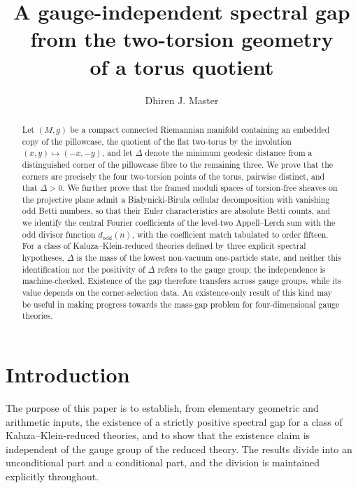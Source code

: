\documentclass[11pt,a4paper]{article}
\title{A gauge-independent spectral gap from the two-torsion geometry\\ of a torus quotient}
\author{Dhiren J. Master}
\date{}
\newcommand{\dodd}{d_{\mathrm{odd}}}
\theoremstyle{plain}
\theoremstyle{definition}
\theoremstyle{remark}
\begin{document}
\maketitle

\begin{abstract}
Let $(M,g)$ be a compact connected Riemannian manifold containing an
embedded copy of the pillowcase, the quotient of the flat two-torus by
the involution $(x,y) \mapsto (-x,-y)$, and let $\Delta$ denote the
minimum geodesic distance from a distinguished corner of the pillowcase
fibre to the remaining three. We prove that the corners are precisely
the four two-torsion points of the torus, pairwise distinct, and that
$\Delta > 0$. We further prove that the framed moduli spaces of
torsion-free sheaves on the projective plane admit a
Bia{\l}ynicki-Birula cellular decomposition with vanishing odd Betti
numbers, so that their Euler characteristics are absolute Betti counts,
and we identify the central Fourier coefficients of the level-two
Appell--Lerch sum with the odd divisor function $\dodd(n)$, with the
coefficient match tabulated to order fifteen. For a class of
Kaluza--Klein-reduced theories defined by three explicit spectral
hypotheses, $\Delta$ is the mass of the lowest non-vacuum one-particle
state, and neither this identification nor the positivity of $\Delta$
refers to the gauge group; the independence is machine-checked.
Existence of the gap therefore transfers across gauge groups, while
its value depends on the corner-selection data. An existence-only
result of this kind may be useful in making progress towards the
mass-gap problem for four-dimensional gauge theories.
\end{abstract}

\section{Introduction}\label{sec:intro}

The purpose of this paper is to establish, from elementary geometric
and arithmetic inputs, the existence of a strictly positive spectral
gap for a class of Kaluza--Klein-reduced theories, and to show that
the existence claim is independent of the gauge group of the reduced
theory. The results divide into an unconditional part and a
conditional part, and the division is maintained explicitly
throughout.
\end{document}
